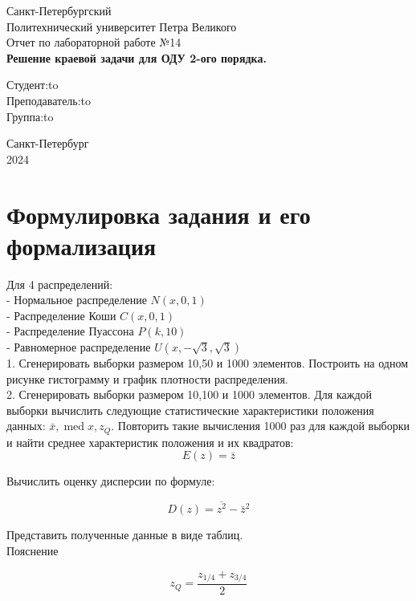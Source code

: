 \documentclass[a4paper]{article}
\begin{document}
    \begin{titlepage}
        \Large
        \begin{center}
            Санкт-Петербургский \\ Политехнический университет Петра Великого\\
            \vspace{10em}Отчет по лабораторной работе №14\\
            \vspace{2em}
            \textbf{Решение краевой задачи для ОДУ 2-ого порядка.}
        \end{center}
        \vspace{6em}
        \newbox{\lbox}
        \newlength{\maxl}
        \setlength{\maxl}{\wd\lbox}
        \hfill\parbox{10cm}{
            \hspace*{2cm}\hspace*{-4cm}Студент:\hfill\hbox to\\
            \hspace*{2cm}\hspace*{-4cm}Преподаватель:\hfill\hbox to\\
            \hspace*{2cm}\hspace*{-4cm}Группа:\hfill\hbox to
        }
        \vspace{\fill}
        \begin{center}
            Санкт-Петербург \\2024
        \end{center}
    \end{titlepage}


    \section{Формулировка задания и его формализация}\label{sec:----}
    Для 4 распределений:\\
    - Нормальное распределение $N(x, 0,1)$\\
    - Распределение Коши $C(x, 0,1)$\\
    - Распределение Пуассона $P(k, 10)$\\
    - Равномерное распределение $U(x,-\sqrt{3}, \sqrt{3})$\\
    1. Сгенерировать выборки размером 10,50 и 1000 элементов.
    Построить на одном рисунке гистограмму и график плотности распределения.\\
    2.
    Сгенерировать выборки размером 10,100 и 1000 элементов.
    Для каждой выборки вычислить следующие статистические характеристики положения данных:
    $\bar{x}, \operatorname{med} x, z_Q$.
    Повторить такие вычисления 1000 раз для каждой выборки и найти среднее характеристик положения и их квадратов:
    \\
    $$
    E(z)=\bar{z}
    $$


    Вычислить оценку дисперсии по формуле:

    $$
    D(z)=\overline{z^2}-\bar{z}^2
    $$


    Представить полученные данные в виде таблиц.
    \\  Пояснение

    $$
    z_Q=\frac{z_{1 / 4}+z_{3 / 4}}{2}
    $$
\end{document}

